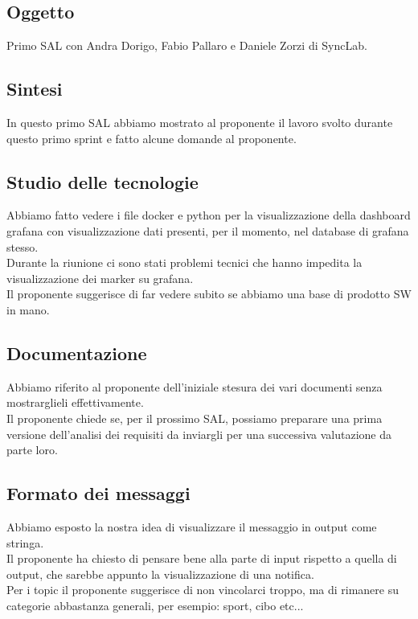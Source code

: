 \documentclass[12pt]{article}
\begin{document}
\subsection{Oggetto}
Primo SAL con Andra Dorigo, Fabio Pallaro e Daniele Zorzi di SyncLab.

\subsection{Sintesi}
In questo primo SAL abbiamo mostrato al proponente il lavoro svolto durante questo primo sprint e fatto alcune domande al proponente.
\subsection{Studio delle tecnologie}
Abbiamo fatto vedere i file docker e python per la visualizzazione della dashboard grafana con visualizzazione dati presenti, per il momento, nel database di grafana stesso.\\
Durante la riunione ci sono stati problemi tecnici che hanno impedita la visualizzazione dei marker su grafana.\\
Il proponente suggerisce di far vedere subito se abbiamo una base di prodotto SW in mano.

\subsection{Documentazione}
Abbiamo riferito al proponente dell'iniziale stesura dei vari documenti senza mostrarglieli effettivamente.\\
Il proponente chiede se, per il prossimo SAL, possiamo preparare una prima versione dell'analisi dei requisiti da inviargli per una successiva valutazione da parte loro.

\subsection{Formato dei messaggi}
Abbiamo esposto la nostra idea di visualizzare il messaggio in output come stringa.\\
Il proponente ha chiesto di pensare bene alla parte di input rispetto a quella di output, che sarebbe appunto la visualizzazione di una notifica.\\
Per i topic il proponente suggerisce di non vincolarci troppo, ma di rimanere su categorie abbastanza generali, per esempio: sport, cibo etc...
\end{document}
